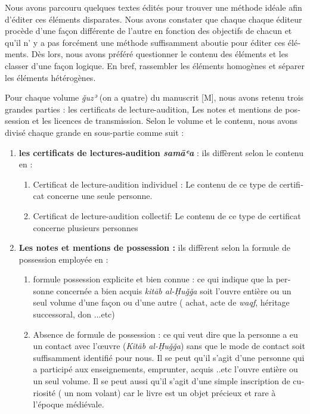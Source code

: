 \documentclass[a4paper,12pt]{report}
\begin{document}
\begin{itemize}
\begin{enumerate}
\begin{french}
Nous avons parcouru  quelques  textes édités pour trouver une méthode idéale  afin d'éditer  ces éléments disparates. Nous avons constater que chaque chaque éditeur procède d'une façon différente de l'autre en fonction des objectifs de chacun et qu'il n' y a pas forcément une méthode suffisamment aboutie  pour éditer ces éléments. Dès lors, nous avons préféré questionner le contenu des éléments et les classer d'une façon logique. En bref,  rassembler les éléments homogènes et  séparer les éléments hétérogènes. 

Pour chaque volume \textit{ǧuzʾ} (on a quatre) du manuscrit [M], nous avons retenu trois grandes parties : les certificats de lecture-audition, Les notes et mentions de possession et les licences de transmission. Selon le volume et le contenu,  nous avons divisé chaque grande en sous-partie comme suit :

\begin{enumerate}
    \item \textbf{les certificats de lectures-audition \textit{samāʿa} }: ils diffèrent selon le contenu en :
    \begin{enumerate}
        \item Certificat de lecture-audition  individuel : Le contenu de ce type de certificat concerne une seule personne. 
        
      \item Certificat de lecture-audition  collectif:      Le contenu de ce type de certificat concerne plusieurs personnes 
        
    \end{enumerate}

\item    \textbf{Les notes et mentions de possession : } ils diffèrent selon la formule de possession employée  en : 
\begin{enumerate}
    \item  formule possession explicite et bien connue : ce qui indique que la personne concernée a bien acquis \textit{ kitāb al-Ḥuǧǧa} soit l'ouvre entière ou un seul volume  d'une façon ou d'une autre ( achat, acte de \textit{waqf}, héritage successoral, don ...etc)
\item Absence de formule de possession : ce qui veut dire que la personne a eu un contact avec l'œuvre  (\textit{Kitāb al-Ḥuǧǧa}) sans que le mode de contact soit  suffisamment identifié pour nous.  Il se peut qu'il s'agit d'une personne qui a participé aux enseignements, emprunter,  acquis ..etc l'ouvre entière ou un seul volume. Il se peut aussi qu'il s'agit d'une simple inscription de curiosité ( un nom volant) car le livre est un objet précieux et rare à l'époque médiévale.  
    

\end{enumerate}
\end{enumerate}
\end{french}
\end{enumerate}
\end{itemize}
\end{document}
